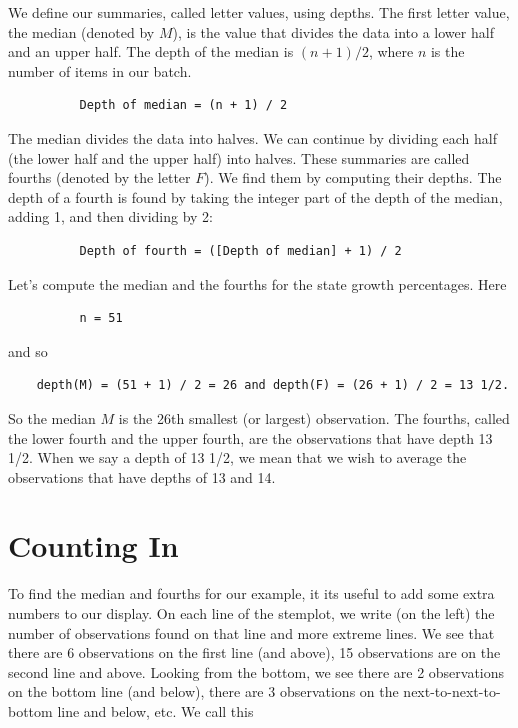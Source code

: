 \documentclass[
]{book}
\begin{document}
We define our summaries, called letter values, using depths. The first letter value, the median (denoted by \(M\)), is the value that divides the data into a lower half and an upper half. The depth of the median is \((n+1)/2\), where \(n\) is the number of items in our batch.

\begin{verbatim}
          Depth of median = (n + 1) / 2
\end{verbatim}

The median divides the data into halves. We can continue by dividing each half (the lower half and the upper half) into halves. These summaries are called fourths (denoted by the letter \(F\)). We find them by computing their depths. The depth of a fourth is found by taking the integer part of the depth of the median, adding 1, and then dividing by 2:

\begin{verbatim}
          Depth of fourth = ([Depth of median] + 1) / 2
\end{verbatim}

Let's compute the median and the fourths for the state growth percentages. Here

\begin{verbatim}
          n = 51
\end{verbatim}

and so

\begin{verbatim}
    depth(M) = (51 + 1) / 2 = 26 and depth(F) = (26 + 1) / 2 = 13 1/2.
\end{verbatim}

So the median \(M\) is the 26th smallest (or largest) observation. The fourths, called the lower fourth and the upper fourth, are the observations that have depth 13 1/2. When we say a depth of 13 1/2, we mean that we wish to average the observations that have depths of 13 and 14.

\hypertarget{counting-in}{%
\section{Counting In}\label{counting-in}}

To find the median and fourths for our example, it its useful to add some extra numbers to our display. On each line of the stemplot, we write (on the left) the number of observations found on that line and more extreme lines. We see that there are 6 observations on the first line (and above), 15 observations are on the second line and above. Looking from the bottom, we see there are 2 observations on the bottom line (and below), there are 3 observations on the next-to-next-to-bottom line and below, etc. We call this
\end{document}
